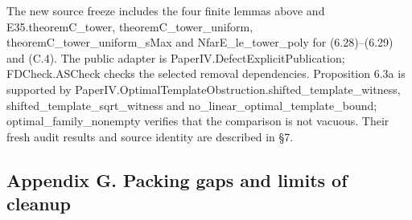 \documentclass[english,11pt,a4paper]{article}
\newcounter{none}
\begin{document}
The new source freeze includes the four finite lemmas above and {\ttfamily\small E35.\discretionary{\hbox{\ensuremath{\hookrightarrow}}}{}{}theoremC\_\discretionary{\hbox{\ensuremath{\hookrightarrow}}}{}{}tower}, {\ttfamily\small theoremC\_\discretionary{\hbox{\ensuremath{\hookrightarrow}}}{}{}tower\_\discretionary{\hbox{\ensuremath{\hookrightarrow}}}{}{}uniform}, {\ttfamily\small theoremC\_\discretionary{\hbox{\ensuremath{\hookrightarrow}}}{}{}tower\_\discretionary{\hbox{\ensuremath{\hookrightarrow}}}{}{}uniform\_\discretionary{\hbox{\ensuremath{\hookrightarrow}}}{}{}sMax} and {\ttfamily\small NfarE\_\discretionary{\hbox{\ensuremath{\hookrightarrow}}}{}{}le\_\discretionary{\hbox{\ensuremath{\hookrightarrow}}}{}{}tower\_\discretionary{\hbox{\ensuremath{\hookrightarrow}}}{}{}poly} for (6.28)--(6.29) and (C.4). The public adapter is {\ttfamily\small PaperIV.\discretionary{\hbox{\ensuremath{\hookrightarrow}}}{}{}DefectExplic\discretionary{\hbox{\ensuremath{\hookrightarrow}}}{}{}itPublicatio\discretionary{\hbox{\ensuremath{\hookrightarrow}}}{}{}n}; {\ttfamily\small FDCheck.\discretionary{\hbox{\ensuremath{\hookrightarrow}}}{}{}ASCheck} checks the selected removal dependencies. Proposition 6.3a is supported by {\ttfamily\small PaperIV.\discretionary{\hbox{\ensuremath{\hookrightarrow}}}{}{}OptimalTempl\discretionary{\hbox{\ensuremath{\hookrightarrow}}}{}{}ateObstructi\discretionary{\hbox{\ensuremath{\hookrightarrow}}}{}{}on.\discretionary{\hbox{\ensuremath{\hookrightarrow}}}{}{}shifted\_\discretionary{\hbox{\ensuremath{\hookrightarrow}}}{}{}template\_\discretionary{\hbox{\ensuremath{\hookrightarrow}}}{}{}witness}, {\ttfamily\small shifted\_\discretionary{\hbox{\ensuremath{\hookrightarrow}}}{}{}template\_\discretionary{\hbox{\ensuremath{\hookrightarrow}}}{}{}sqrt\_\discretionary{\hbox{\ensuremath{\hookrightarrow}}}{}{}witness} and {\ttfamily\small no\_\discretionary{\hbox{\ensuremath{\hookrightarrow}}}{}{}linear\_\discretionary{\hbox{\ensuremath{\hookrightarrow}}}{}{}optimal\_\discretionary{\hbox{\ensuremath{\hookrightarrow}}}{}{}template\_\discretionary{\hbox{\ensuremath{\hookrightarrow}}}{}{}bound}; {\ttfamily\small optimal\_\discretionary{\hbox{\ensuremath{\hookrightarrow}}}{}{}family\_\discretionary{\hbox{\ensuremath{\hookrightarrow}}}{}{}nonempty} verifies that the comparison is not vacuous. Their fresh audit results and source identity are described in §7.

\subsection{Appendix G. Packing gaps and limits of cleanup}\label{appendix-g.-packing-gaps-and-limits-of-cleanup}
\end{document}
